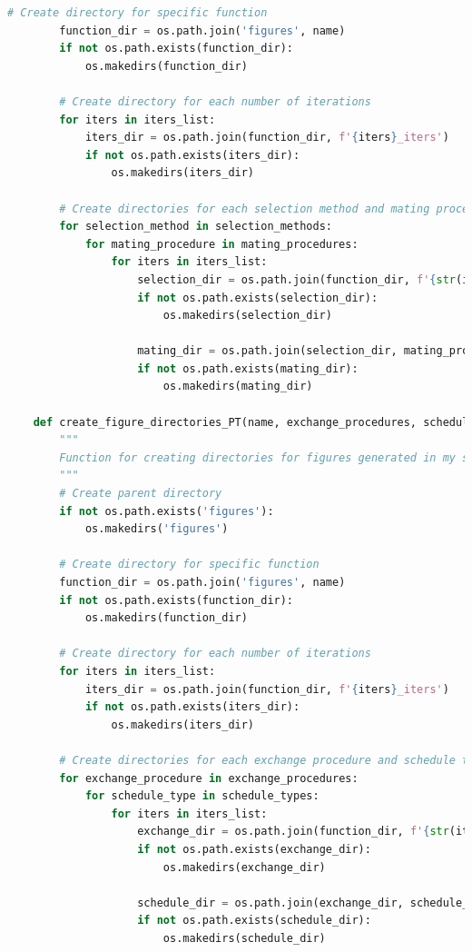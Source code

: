 \documentclass[10pt]{article}
\begin{document}
\begin{lstlisting}[language=Python, caption=helper\_functions.py, label=helper_functionspy]
        # Create directory for specific function
        function_dir = os.path.join('figures', name)
        if not os.path.exists(function_dir):
            os.makedirs(function_dir)
    
        # Create directory for each number of iterations
        for iters in iters_list:
            iters_dir = os.path.join(function_dir, f'{iters}_iters')
            if not os.path.exists(iters_dir):
                os.makedirs(iters_dir)
    
        # Create directories for each selection method and mating procedure
        for selection_method in selection_methods:
            for mating_procedure in mating_procedures:
                for iters in iters_list:
                    selection_dir = os.path.join(function_dir, f'{str(iters)}_iters', selection_method)
                    if not os.path.exists(selection_dir):
                        os.makedirs(selection_dir)
    
                    mating_dir = os.path.join(selection_dir, mating_procedure)
                    if not os.path.exists(mating_dir):
                        os.makedirs(mating_dir)
    
    def create_figure_directories_PT(name, exchange_procedures, schedule_types, iters_list):
        """
        Function for creating directories for figures generated in my simulations.
        """
        # Create parent directory
        if not os.path.exists('figures'):
            os.makedirs('figures')
    
        # Create directory for specific function
        function_dir = os.path.join('figures', name)
        if not os.path.exists(function_dir):
            os.makedirs(function_dir)
    
        # Create directory for each number of iterations
        for iters in iters_list:
            iters_dir = os.path.join(function_dir, f'{iters}_iters')
            if not os.path.exists(iters_dir):
                os.makedirs(iters_dir)
    
        # Create directories for each exchange procedure and schedule type
        for exchange_procedure in exchange_procedures:
            for schedule_type in schedule_types:
                for iters in iters_list:
                    exchange_dir = os.path.join(function_dir, f'{str(iters)}_iters', exchange_procedure)
                    if not os.path.exists(exchange_dir):
                        os.makedirs(exchange_dir)
    
                    schedule_dir = os.path.join(exchange_dir, schedule_type)
                    if not os.path.exists(schedule_dir):
                        os.makedirs(schedule_dir)
    

\end{lstlisting}
\end{document}
